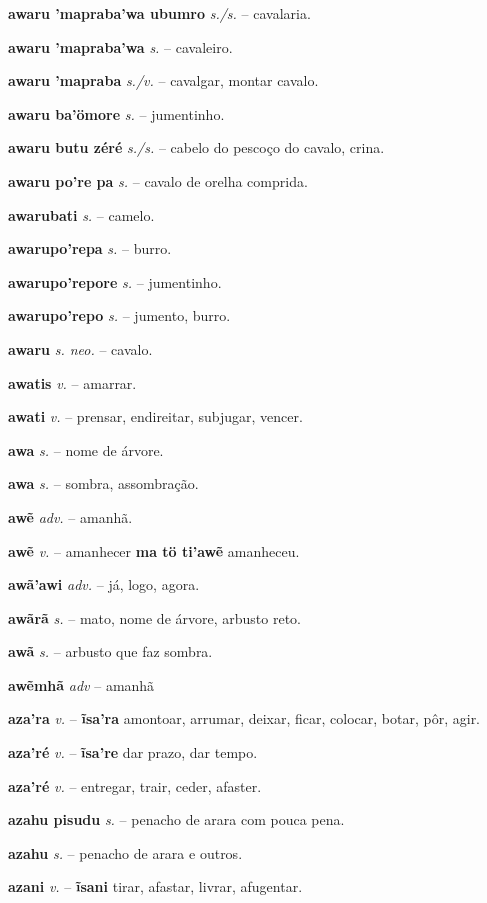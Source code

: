 \textbf{awaru 'mapraba'wa ubumro} \textit{s./s.} -- cavalaria.

\textbf{awaru 'mapraba'wa} \textit{s.} -- cavaleiro.

\textbf{awaru 'mapraba} \textit{s./v.} -- cavalgar, montar cavalo.

\textbf{awaru ba'ömore} \textit{s.} -- jumentinho.

\textbf{awaru butu zéré} \textit{s./s.} -- cabelo do pescoço do cavalo, crina.

\textbf{awaru po're pa} \textit{s.} -- cavalo de orelha comprida.

\textbf{awarubati} \textit{s.} -- camelo.

\textbf{awarupo'repa} \textit{s.} -- burro.

\textbf{awarupo'repore} \textit{s.} -- jumentinho.

\textbf{awarupo'repo} \textit{s.} -- jumento, burro.

\textbf{awaru} \textit{s. neo.} -- cavalo.

\textbf{awatis} \textit{v.} -- amarrar.

\textbf{awati} \textit{v.} -- prensar, endireitar, subjugar, vencer.

\textbf{awa} \textit{s.} -- nome de árvore.

\textbf{awa} \textit{s.} -- sombra, assombração.

\textbf{awẽ} \textit{adv.} -- amanhã.

\textbf{awẽ} \textit{v.} -- amanhecer  \textbf{ma tö ti'awẽ} amanheceu.

\textbf{awã'awi} \textit{adv.} -- já, logo, agora.

\textbf{awãrã} \textit{s.} -- mato, nome de árvore, arbusto reto.

\textbf{awã} \textit{s.} -- arbusto que faz sombra.

\textbf{awẽmhã} \textit{adv} -- {amanhã}

\textbf{aza'ra} \textit{v.} -- \textbf{ĩsa'ra} amontoar, arrumar, deixar, ficar, colocar, botar, pôr, agir.

\textbf{aza'ré} \textit{v.} -- \textbf{ĩsa're} dar prazo, dar tempo.

\textbf{aza'ré} \textit{v.} -- entregar, trair, ceder, afaster.

\textbf{azahu pisudu} \textit{s.} -- penacho de arara com pouca pena.

\textbf{azahu} \textit{s.} -- penacho de arara e outros.

\textbf{azani} \textit{v.} -- \textbf{ĩsani} tirar, afastar, livrar, afugentar.

